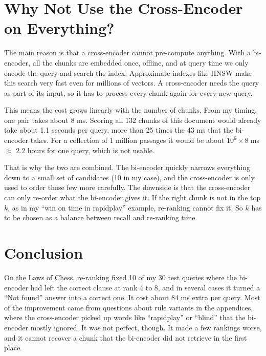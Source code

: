 \documentclass[11pt,a4paper]{article}
\begin{document}
\section{Why Not Use the Cross-Encoder on Everything?}

The main reason is that a cross-encoder cannot pre-compute anything. With a bi-encoder, all the chunks are embedded once, offline, and at query time we only encode the query and search the index. Approximate indexes like HNSW make this search very fast even for millions of vectors. A cross-encoder needs the query as part of its input, so it has to process every chunk again for every new query.

This means the cost grows linearly with the number of chunks. From my timing, one pair takes about 8 ms. Scoring all 132 chunks of this document would already take about 1.1 seconds per query, more than 25 times the 43 ms that the bi-encoder takes. For a collection of 1 million passages it would be about $10^6 \times 8$ ms $\approx$ 2.2 hours for one query, which is not usable.

That is why the two are combined. The bi-encoder quickly narrows everything down to a small set of candidates (10 in my case), and the cross-encoder is only used to order those few more carefully. The downside is that the cross-encoder can only re-order what the bi-encoder gives it. If the right chunk is not in the top $k$, as in my ``win on time in rapidplay'' example, re-ranking cannot fix it. So $k$ has to be chosen as a balance between recall and re-ranking time.

\section{Conclusion}

On the Laws of Chess, re-ranking fixed 10 of my 30 test queries where the bi-encoder had left the correct clause at rank 4 to 8, and in several cases it turned a ``Not found'' answer into a correct one. It cost about 84 ms extra per query. Most of the improvement came from questions about rule variants in the appendices, where the cross-encoder picked up words like ``rapidplay'' or ``blind'' that the bi-encoder mostly ignored. It was not perfect, though. It made a few rankings worse, and it cannot recover a chunk that the bi-encoder did not retrieve in the first place.
\end{document}
